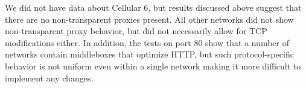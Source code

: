 \documentclass{sig-alternate-10pt}
\begin{document}
We did not have data about Cellular 6, but results discussed above suggest that there are no non-transparent proxies present. All other networks did not show non-transparent proxy behavior, but did not necessarily allow for TCP modifications either. In addition, the tests on port 80 show that a number of networks contain middleboxes that optimize HTTP, but such protocol-specific behavior is not uniform even within a single network making it more difficult to implement any changes.


\end{document}
